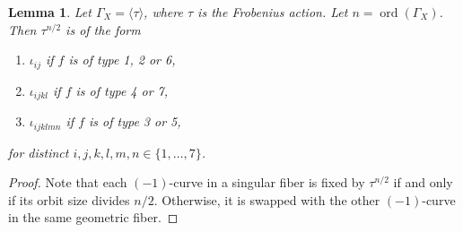\documentclass[a4paper, 11pt, reqno]{amsart}
\numberwithin{equation}{section} \numberwithin{figure}{section}
\DeclareMathOperator{\ord}{ord}
\newtheorem{lemma}{Lemma}
\theoremstyle{definition}
\numberwithin{lemma}{section}
\begin{document}

\begin{lemma}\label{lem:galoisorbitnn/2}
    Let $\Gamma_X = \langle \tau \rangle$, where $\tau$ is the Frobenius action. Let $n = \ord(\Gamma_X)$. Then $\tau^{n/2}$ is of the form
    \begin{enumerate}
        \item $\iota_{ij}$ if $f$ is of type 1, 2 or 6,
        \item $\iota_{ijkl}$ if $f$ is of type 4 or 7,
        \item $\iota_{ijklmn}$ if $f$ is of type 3 or 5, 
    \end{enumerate}
    for distinct $i, j, k, l, m, n \in \{1, \ldots, 7\}$.
\end{lemma}

\begin{proof}
    Note that each $(-1)$-curve in a singular fiber is fixed by $\tau^{n/2}$ if and only if its orbit size divides $n/2$. Otherwise, it is swapped with the other $(-1)$-curve in the same geometric fiber. 
\end{proof}

\end{document}
